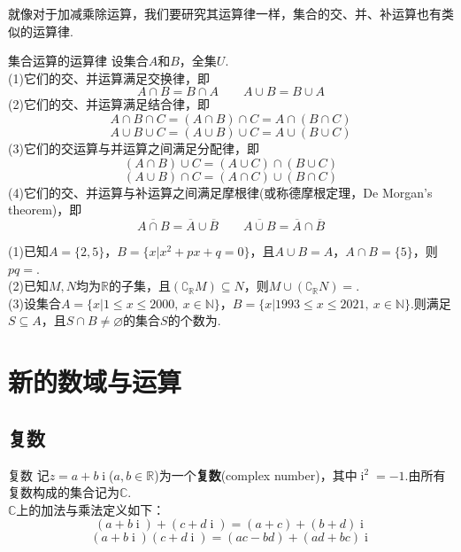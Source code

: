 \documentclass[lang=cn, zihao=4.5]{elegantbook}
\newcommand{\R}{\mathbb{R}}
\newcommand{\C}{\mathbb{C}}
\newcommand{\tk}{\uline{\hspace{4em}}}
\DeclareMathOperator{\ic}{i}
\begin{document}
就像对于加减乘除运算，我们要研究其运算律一样，集合的交、并、补运算也有类似的运算律.

\begin{proposition}{集合运算的运算律}
	设集合$A$和$B$，全集$U$. \\
	(1)它们的交、并运算满足交换律，即$$A \cap B = B \cap A \qquad A \cup B = B \cup A$$
	(2)它们的交、并运算满足结合律，即
	$$A \cap B \cap C = (A \cap B) \cap C = A \cap (B \cap C)$$
	$$A \cup B \cup C = (A \cup B) \cup C = A \cup (B \cup C)$$
	(3)它们的交运算与并运算之间满足分配律，即
	$$(A \cap B) \cup C = (A \cup C) \cap (B \cup C)$$
	$$(A \cup B) \cap C = (A \cap C) \cup (B \cap C)$$
	(4)它们的交、并运算与补运算之间满足摩根律(或称德摩根定理，De Morgan's theorem)，即$$\overline{A \cap B} = \overline{A} \cup \overline{B} \qquad \overline{A \cup B} = \overline{A} \cap \overline{B}$$
\end{proposition}

\begin{example}
	(1)已知$A=\{ 2,5 \}$，$B = \{ x|x^2+px+q=0 \}$，且$A \cup B = A$，$A \cap B = \{ 5 \}$，则$pq=$\tk . \\
	(2)已知$M,N$均为$\mathbb{R}$的子集，且$(\complement _{\mathbb{R}} M) \subseteq N$，则$M \cup (\complement _{\mathbb{R}} N)=$\tk . \\
	(3)设集合$A = \{ x|1 \leq x \leq 2000,~x \in \mathbb{N} \}$，$B = \{ x|1993 \leq x \leq 2021,~x \in \mathbb{N} \}$.则满足$S \subseteq A$，且$S \cap B \neq \varnothing$的集合$S$的个数为\tk .
\end{example}


\chapter{新的数域与运算}

\section{复数}

\begin{definition}{复数}
	记$z=a+b\ic $($a,b \in \R$)为一个\textbf{复数}(complex number)，其中$\ic ^2=-1$.由所有复数构成的集合记为$\C$. \\
	$\C$上的加法与乘法定义如下：
	$$(a+b\ic ) + (c+d\ic ) = (a+c) + (b+d)\ic $$
	$$(a+b\ic )(c+d\ic ) = (ac-bd) + (ad+bc)\ic $$
\end{definition}
\end{document}
